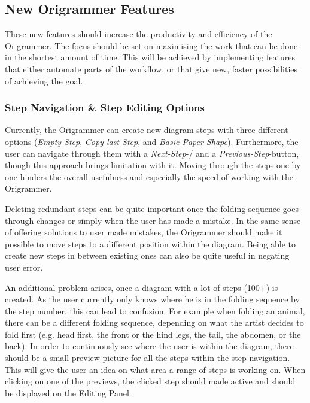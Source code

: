
\subsection{New Origrammer Features}

These new features should increase the productivity and efficiency of the Origrammer. The focus should be set on maximising the work that can be done in the shortest amount of time. This will be achieved by implementing features that either automate parts of the workflow, or that give new, faster possibilities of achieving the goal.

\subsubsection{Step Navigation \& Step Editing Options}

Currently, the Origrammer can create new diagram steps with three different options (\emph{Empty Step}, \emph{Copy last Step}, and \emph{Basic Paper Shape}). Furthermore, the user can navigate through them with a \emph{Next-Step}-/ and a \emph{Previous-Step}-button, though this approach brings limitation with it. Moving through the steps one by one hinders the overall usefulness and especially the speed of working with the Origrammer.

Deleting redundant steps can be quite important once the folding sequence goes through changes or simply when the user has made a mistake. In the same sense of offering solutions to user made mistakes, the Origrammer should make it possible to move steps to a different position within the diagram. Being able to create new steps in between existing ones can also be quite useful in negating user error.

An additional problem arises, once a diagram with a lot of steps (100+) is created. As the user currently only knows where he is in the folding sequence by the step number, this can lead to confusion. For example when folding an animal, there can be a different folding sequence, depending on what the artist decides to fold first (e.g. head first, the front or the hind legs, the tail, the abdomen, or the back). In order to continuously see where the user is within the diagram, there should be a small preview picture for all the steps within the step navigation. This will give the user an idea on what area a range of steps is working on. When clicking on one of the previews, the clicked step should made active and should be displayed on the Editing Panel.

